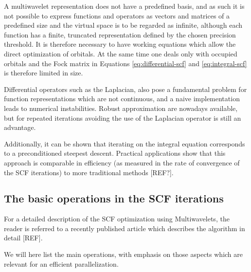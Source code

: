 \documentclass[%
 aip,
 amsmath,amssymb,
 reprint,%
]{revtex4-1}
\begin{document}
A multiwavelet representation does not have a predefined basis, and as such it is not possible to express functions and operators as vectors and matrices of a predefined size and the virtual space is to be regarded as infinite, although each function has a finite, truncated representation defined by the chosen precision threshold. It is therefore necessary to have working equations which allow the direct optimization of orbitals.
At the same time one deals only with occupied orbitals and the Fock matrix in Equations \ref{eq:differential-scf} and \ref{eq:integral-scf} is therefore limited in size. 

Differential operators such as the Laplacian, also pose a fundamental problem for function representations which are not continuous, and a naive implementation leads to numerical instabilities. Robust approximation are nowadays available\cite{der-paper}, but for repeated iterations avoiding the use of the Laplacian operator is still an advantage. 


Additionally, it can be shown that iterating on the integral equation corresponds to a preconditioned steepest descent. Practical applications show that this approach is comparable in efficiency (as measured in the rate of convergence of the SCF iterations) to more traditional methods [REF?]. 

\subsection{The basic operations in the SCF iterations} %

For a detailed description of the SCF optimization using Multiwavelets, the reader is referred to a recently published article which describes the algorithm in detail [REF].

We will here list the main operations, with emphasis on those aspects which are relevant for an efficient parallelization.
\end{document}
